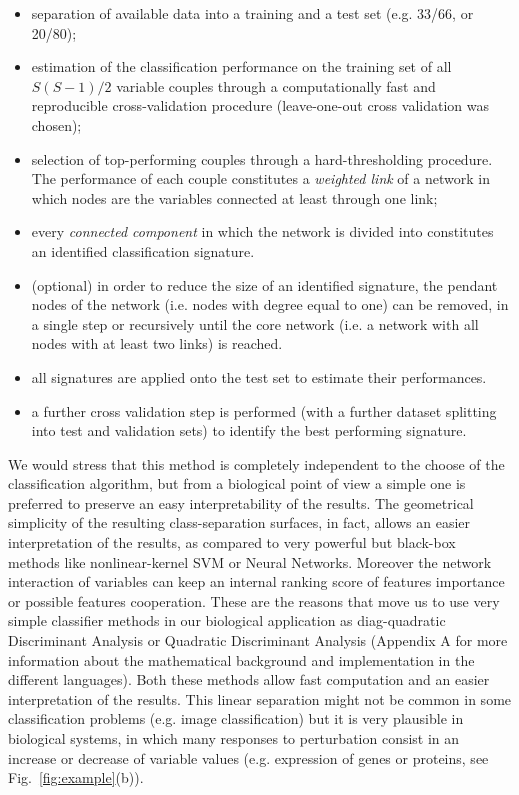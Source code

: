 \documentclass{standalone}
\begin{document}
\begin{itemize}

\item separation of available data into a training and a test set (e.g. 33/66, or 20/80);

\item estimation of the classification performance on the training set of all $S(S-1)/2$ variable couples through a computationally fast and reproducible cross-validation procedure (leave-one-out cross validation was chosen);

\item selection of top-performing couples through a hard-thresholding procedure.
The performance of each couple constitutes a \emph{weighted link} of a network in which nodes are the variables connected at least through one link;

\item every \emph{connected component} in which the network is divided into constitutes an identified classification signature.

\item (optional) in order to reduce the size of an identified signature, the pendant nodes of the network (i.e. nodes with degree equal to one) can be removed, in a single step or recursively until the core network (i.e. a network with all nodes with at least two links) is reached.

\item all signatures are applied onto the test set to estimate their performances.

\item a further cross validation step is performed (with a further dataset splitting into test and validation sets) to identify the best performing signature.

\end{itemize}

We would stress that this method is completely independent to the choose of the classification algorithm, but from a biological point of view a simple one is preferred to preserve an easy interpretability of the results.
The geometrical simplicity of the resulting class-separation surfaces, in fact, allows an easier interpretation of the results, as compared to very powerful but black-box methods like nonlinear-kernel SVM or Neural Networks.
Moreover the network interaction of variables can keep an internal ranking score of features importance or possible features cooperation.
These are the reasons that move us to use very simple classifier methods in our biological application as diag-quadratic Discriminant Analysis or Quadratic Discriminant Analysis (Appendix A for more information about the mathematical background and implementation in the different languages).
Both these methods allow fast computation and an easier interpretation of the results.
This linear separation might not be common in some classification problems (e.g. image classification) but it is very plausible in biological systems, in which many responses to perturbation consist in an increase or decrease of variable values (e.g. expression of genes or proteins, see Fig.~\ref{fig:example}(b)).
\end{document}
